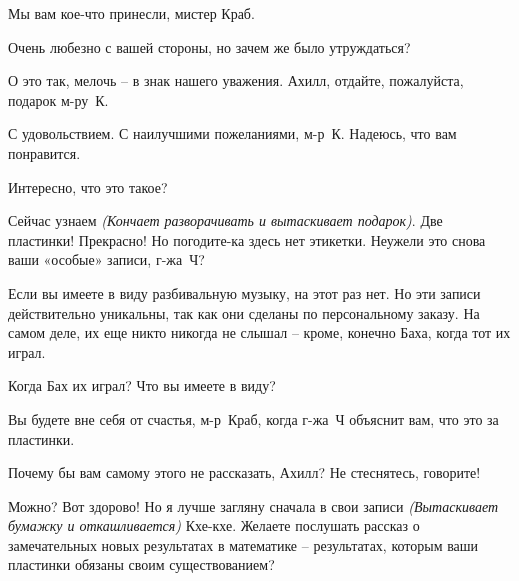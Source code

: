 \documentclass[../main.tex]{subfiles}
\begin{document}



\begin{dialogue}

 Мы вам кое-что принесли, мистер Краб.

 Очень любезно с вашей стороны, но зачем же было утруждаться?

 О это так, мелочь \--- в знак нашего уважения. Ахилл, отдайте, пожалуйста, подарок м-ру~К.

 С удовольствием. С наилучшими пожеланиями, м-р~К\@. Надеюсь, что вам понравится.


 Интересно, что это такое?

 Сейчас узнаем \emph{(Кончает разворачивать и вытаскивает подарок)}. Две пластинки! Прекрасно! Но погодите-ка здесь нет этикетки. Неужели это снова ваши «особые» записи, г-жа~Ч?

 Если вы имеете в виду разбивальную музыку, на этот раз нет. Но эти записи действительно уникальны, так как они сделаны по персональному заказу. На самом деле, их еще никто никогда не слышал \--- кроме, конечно Баха, когда тот их играл.

 Когда Бах их играл? Что вы имеете в виду?

 Вы будете вне себя от счастья, м-р~Краб, когда г-жа~Ч объяснит вам, что это за пластинки.

 Почему бы вам самому этого не рассказать, Ахилл? Не стеснятесь, говорите!

 Можно? Вот здорово! Но я лучше загляну сначала в свои записи \emph{(Вытаскивает бумажку и откашливается)} Кхе-кхе. Желаете послушать рассказ о замечательных новых результатах в математике \--- результатах, которым ваши пластинки обязаны своим существованием?


\end{dialogue}
\end{document}

